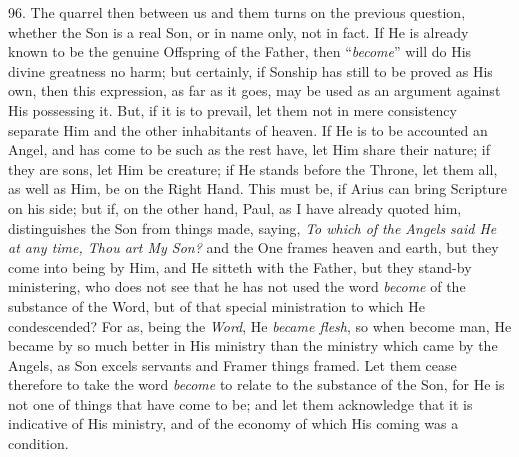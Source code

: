 96. The quarrel then between
us and them turns on the previous question, whether the Son is a real
Son, or in name only, not in fact. If He is already known to be the
genuine Offspring of the Father, then ``\emph{become}'' will do His
divine greatness no harm; but certainly, if Sonship has still to be
proved as His own, then this expression, as far as it goes, may be
used as an argument against His possessing it. But, if it is to
prevail, let them not in mere consistency separate Him and the other
inhabitants of heaven. If He is to be accounted an Angel, and has come
to be such as the rest have, let Him share their nature; if they are
sons, let Him be creature; if He stands before the Throne, let them
all, as well as Him, be on the Right Hand. This must be, if Arius can
bring Scripture on his side; but if, on the other hand, Paul, as I
have already quoted him, distinguishes the Son from things made,
saying, \emph{To which of the Angels said He at any time, Thou art
My Son?} and the One frames heaven and earth, but they come into
being by Him, and He sitteth with the Father, but they stand-by
ministering, who does not see that he has not used the word \emph{become}
of the substance of the Word, but of that special ministration to
which He condescended? For as, being the \emph{Word}, He \emph{became
flesh}, so when become man, He became by so much better in His
ministry than the ministry which came by the Angels, as Son excels
servants and Framer things framed. Let them cease therefore to take
the word \emph{become} to relate to the substance of the Son, for He
is not one of things that have come to be; and let them acknowledge
that it is indicative of His ministry, and of the economy of which His
coming was a condition.


